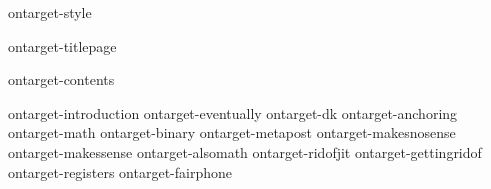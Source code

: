 
\environment ontarget-style

\dontcomplain

\startdocument

    \component ontarget-titlepage

    \startfrontmatter
        \component ontarget-contents
    \stopfrontmatter

    \startbodymatter
        \component ontarget-introduction
        \component ontarget-eventually
        \component ontarget-dk
        \component ontarget-anchoring
        \component ontarget-math
        \component ontarget-binary
        \component ontarget-metapost
        \component ontarget-makesnosense
        \component ontarget-makessense
        \component ontarget-alsomath
        \component ontarget-ridofjit
        \component ontarget-gettingridof
        \component ontarget-registers
        \component ontarget-fairphone
    \stopbodymatter

\stopdocument
